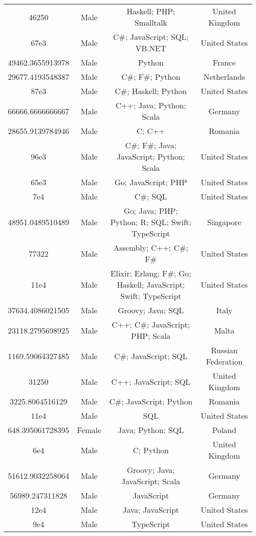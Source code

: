 \begin{center}
\begin{tabular}{ |c|c|c|c| }
46250  &  Male  &  Haskell; PHP; Smalltalk  &  United Kingdom  \\ 
67e3  &  Male  &  C\#; JavaScript; SQL; VB.NET  &  United States  \\ 
49462.3655913978  &  Male  &  Python  &  France  \\ 
29677.4193548387  &  Male  &  C\#; F\#; Python  &  Netherlands  \\ 
87e3  &  Male  &  C\#; Haskell; Python  &  United States  \\ 
66666.6666666667  &  Male  &  C++; Java; Python; Scala  &  Germany  \\ 
28655.9139784946  &  Male  &  C; C++  &  Romania  \\ 
96e3  &  Male  &  C\#; F\#; Java; JavaScript; Python; Scala  &  United States  \\ 
65e3  &  Male  &  Go; JavaScript; PHP  &  United States  \\ 
7e4  &  Male  &  C\#; SQL  &  United States  \\ 
48951.0489510489  &  Male  &  Go; Java; PHP; Python; R; SQL; Swift; TypeScript  &  Singapore  \\ 
77322  &  Male  &  Assembly; C++; C\#; F\#  &  United States  \\ 
11e4  &  Male  &  Elixir; Erlang; F\#; Go; Haskell; JavaScript; Swift; TypeScript  &  United States  \\ 
37634.4086021505  &  Male  &  Groovy; Java; SQL  &  Italy  \\ 
23118.2795698925  &  Male  &  C++; C\#; JavaScript; PHP; Scala  &  Malta  \\ 
1169.59064327485  &  Male  &  C\#; JavaScript; SQL  &  Russian Federation  \\ 
31250  &  Male  &  C++; JavaScript; SQL  &  United Kingdom  \\ 
3225.8064516129  &  Male  &  C\#; JavaScript; Python  &  Romania  \\ 
11e4  &  Male  &  SQL  &  United States  \\ 
648.395061728395  &  Female  &  Java; Python; SQL  &  Poland  \\ 
6e4  &  Male  &  C; Python  &  United Kingdom  \\ 
51612.9032258064  &  Male  &  Groovy; Java; JavaScript; Scala  &  Germany  \\ 
56989.247311828  &  Male  &  JavaScript  &  Germany  \\ 
12e4  &  Male  &  Java; JavaScript  &  United States  \\ 
9e4  &  Male  &  TypeScript  &  United States  \\ 

\end{tabular}
\end{center}
